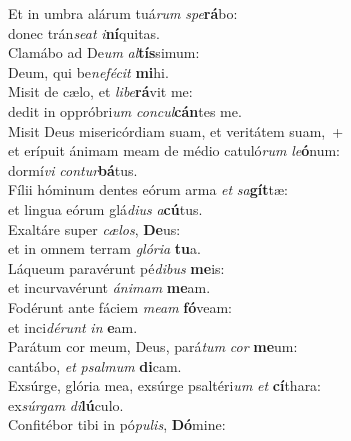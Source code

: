 \evenverse Et in umbra alárum tuá\textit{rum} \textit{spe}\textbf{rá}bo:~\*\\
\evenverse donec trán\textit{se}\textit{at} \textit{i}\textbf{ní}quitas.\\
\oddverse Clamábo ad De\textit{um} \textit{al}\textbf{tís}simum:~\*\\
\oddverse Deum, qui be\textit{ne}\textit{fé}\textit{cit} \textbf{mi}hi.\\
\evenverse Misit de cælo, et \textit{li}\textit{be}\textbf{rá}vit me:~\*\\
\evenverse dedit in oppróbri\textit{um} \textit{con}\textit{cul}\textbf{cán}tes me.\\
\oddverse Misit Deus misericórdiam suam, et veritátem suam,~+\\
\oddverse  et erípuit ánimam meam de médio catuló\textit{rum} \textit{le}\textbf{ó}num:~\*\\
\oddverse dormí\textit{vi} \textit{con}\textit{tur}\textbf{bá}tus.\\
\evenverse Fílii hóminum dentes eórum arma \textit{et} \textit{sa}\textbf{gít}tæ:~\*\\
\evenverse et lingua eórum glá\textit{di}\textit{us} \textit{a}\textbf{cú}tus.\\
\oddverse Exaltáre super \textit{cæ}\textit{los}, \textbf{De}us:~\*\\
\oddverse et in omnem terram \textit{gló}\textit{ri}\textit{a} \textbf{tu}a.\\
\evenverse Láqueum paravérunt pé\textit{di}\textit{bus} \textbf{me}is:~\*\\
\evenverse et incurvavérunt \textit{á}\textit{ni}\textit{mam} \textbf{me}am.\\
\oddverse Fodérunt ante fáciem \textit{me}\textit{am} \textbf{fó}veam:~\*\\
\oddverse et inci\textit{dé}\textit{runt} \textit{in} \textbf{e}am.\\
\evenverse Parátum cor meum, Deus, pará\textit{tum} \textit{cor} \textbf{me}um:~\*\\
\evenverse cantábo, \textit{et} \textit{psal}\textit{mum} \textbf{di}cam.\\
\oddverse Exsúrge, glória mea, exsúrge psaltéri\textit{um} \textit{et} \textbf{cí}thara:~\*\\
\oddverse ex\textit{súr}\textit{gam} \textit{di}\textbf{lú}culo.\\
\evenverse Confitébor tibi in pó\textit{pu}\textit{lis}, \textbf{Dó}mine:~\*\\
